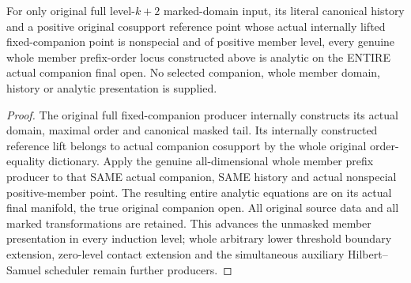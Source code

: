 \begin{theorem}
\label{hir:original-full-positive-whole-member-analytic-consumer}
\leanok
{}
For only original full level-$k+2$ marked-domain input, its literal
canonical history and a positive original cosupport reference point
whose actual internally lifted fixed-companion point is nonspecial and
of positive member level, every genuine whole member prefix-order locus
constructed above is analytic on the ENTIRE actual companion final open.
No selected companion, whole member domain, history or analytic
presentation is supplied.
\end{theorem}
\begin{proof}
The original full fixed-companion producer internally constructs its
actual domain, maximal order and canonical masked tail. Its internally
constructed reference lift belongs to actual companion cosupport by the
whole original order-equality dictionary. Apply the genuine all-dimensional
whole member prefix producer to that SAME actual companion, SAME history
and actual nonspecial positive-member point. The resulting entire
analytic equations are on its actual final manifold, the true original
companion open. All original source data and all marked transformations
are retained. This advances the unmasked member presentation in every
induction level; whole arbitrary lower threshold boundary extension,
zero-level contact extension and the simultaneous auxiliary Hilbert--Samuel
scheduler remain further producers.
\end{proof}
